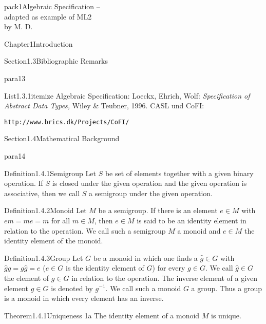 \documentclass[landscape, slides, light]{mmiss2}
\begin{document}
\begin{Package}{pack1}{Algebraic
Specification -- \\ adapted as example of ML2\\ by M. D.}
\begin{Section}{Chapter1}{Introduction}
\begin{Section}{Section1.3}{Bibliographic Remarks}{}
\begin{Paragraph}{para13}{}{}
\begin{List}{List1.3.1}{itemize}{}
\ListItem{}
Algebraic Specification: Loeckx, Ehrich, Wolf: {\it
Specification of Abstract Data Types,} Wiley \& Teubner, 1996.
\ListItem{}
CASL und CoFI: 
\begin{verbatim}
http://www.brics.dk/Projects/CoFI/
\end{verbatim}
\end{List}
\end{Paragraph}

\end{Section}

\begin{Section}{Section1.4}{Mathematical Background}{}
\begin{Paragraph}{para14}{}{}
\begin{Definition}[Algebra]{Definition1.4.1}{Semigroup}{}
Let $S$ be  set of elements together with a given binary operation. If $S$
is closed under the given operation and the given operation is
associative, then we call $S$ a semigroup under the given operation.
\end{Definition}
\newline
\begin{Definition}[Algebra]{Definition1.4.2}{Monoid}{}
Let $M$ be a semigroup. If there is an element $e \in M$ with
$em=me=m$ for all $m \in M$, then $e \in M$ is said to be an identity
element in relation to the operation. We call such a semigroup $M$ a
monoid and $e \in M$ the identity element of the monoid.
\end{Definition}
\newline
\begin{Definition}[Algebra]{Definition1.4.3}{Group}{}
Let $G$ be a monoid in which one finds a $\hat{g} \in G$ with
$\hat{g}g=g\hat{g}=e$ ($e \in G$ is the identity element of $G$) for
every $g \in G$. We call $\hat{g} \in G$ the
 element of $g \in G$ in relation to
the operation. The inverse element of a given
element $g \in G$ is denoted by $g^{-1}$. We call such a monoid $G$ a
group. Thus a group is a monoid in which every element has an inverse.
\end{Definition}
\newline
\begin{Theorem}[Algebra]{Theorem1.4.1}{Uniqueness 1a}{}
The identity element of a monoid $M$ is unique.
\end{Theorem}


\end{Paragraph}
\end{Section}
\end{Section}
\end{Package}
\end{document}
